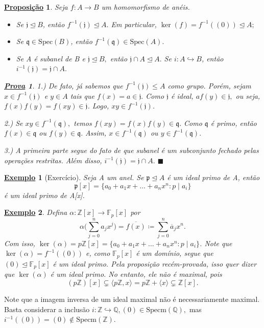 \documentclass{article}
\newtheorem*{prop*}{\underline{Proposi\c c\~ao}}
\newtheorem{example}{\underline{Exemplo}}
\newtheorem*{proof*}{\underline{Prova}}
\renewcommand\qedsymbol{$\blacksquare$}
\begin{document}
\begin{prop*}
  Seja \(f:A\rightarrow B\) um homomorfismo de anéis.
  \begin{itemize}
    \item[1)] Se \(\mathfrak{j}\trianglelefteq{B}\), então \(f^{-1}(\mathfrak{j})\trianglelefteq{A}.\) Em particular, \(\ker{(f)} = f^{-1}((0))\trianglelefteq{A};\)
    \item[2)] Se \(\mathfrak{q}\in \mathrm{Spec}(B)\), então \(f^{-1}(\mathfrak{q})\in \mathrm{Spec}(A).\)
    \item[3)] Se A é subanel de B e \(\mathfrak{j}\trianglelefteq{B},\) então \(\mathfrak{j}\cap A \trianglelefteq{A}.\) Se \(i:A\hookrightarrow B\),
      então \(i^{-1}(\mathfrak{j})=\mathfrak{j}\cap A.\)
  \end{itemize}
  \begin{proof*}
    1.) De fato, já sabemos que \(f^{-1}(\mathfrak{j})\leq A\) como grupo. Porém, sejam \(x\in f^{-1}(\mathfrak{j})\)
    e \(y\in A\) tais que \(f(x) = a\in \mathfrak{j}.\) Como \(\mathfrak{j}\) é ideal, \(af(y)\in \mathfrak{j},\)
    ou seja, \(f(x)f(y) = f(xy)\in \mathfrak{j}\). Logo, \(xy\in f^{-1}(\mathfrak{j})\).

    2.) Se \(xy\in f^{-1}(\mathfrak{q}),\) temos \(f(xy) = f(x)f(y)\in \mathfrak{q}.\) Como \(\mathfrak{q}\) é primo, 
    então \(f(x)\in \mathfrak{q}\) ou \(f(y)\in \mathfrak{q}.\) Assim, \(x\in f^{-1}(\mathfrak{q})\) ou \(y\in f^{-1}(\mathfrak{q}).\)

    3.) A primeira parte segue do fato de que subanel é um subconjunto fechado pelas operações restritas. Além disso,
    \(i^{-1}(\mathfrak{j}) = \mathfrak{j}\cap A.\) \qedsymbol
  \end{proof*}
\end{prop*}
\begin{example}[Exercício]
  Seja A um anel. Se \(\mathfrak{p}\trianglelefteq A\) é um ideal primo de A, então 
  \[
    \mathfrak{p}[x] = \{a_{0} + a_{1}x + \dotsc + a_{n}x^{n}:p\mid a_{i}\}
  \]
  é um ideal primo de A[x].
\end{example}
\begin{example}
  Defina \(\alpha :\mathbb{Z}[x]\rightarrow \mathbb{F}_{p}[x]\) por 
  \[
    \alpha \biggl(\sum\limits_{j=0}^{n}a_{j}x^{j}\biggr) = \overline{f(x)}\coloneqq \sum\limits_{j=0}^{n}\overline{a}_{j}x^{n}.
  \]
  Com isso, \(\ker{(\alpha )} = p \mathbb{Z}[x] = \{a_{0} + a_1x + \dotsc +a_{n}x^{n}: p\mid a_{i}\}\). Note que 
  \(\ker{(\alpha )} = f^{-1}((0))\) e, como \(\mathbb{F}_{p}[x]\) é um domínio, segue que \((0)\trianglelefteq \mathbb{F}_{p}[x]\) é um ideal primo.
  Pela proposição recém-provada, isso quer dizer que \(\ker{(\alpha )}\) é um ideal primo. No entanto, ele não é maximal, pois 
  \[
    (p \mathbb{Z})[x] \subsetneq \langle p \mathbb{Z}, x \rangle = p \mathbb{Z} + \langle x \rangle \subsetneq \mathbb{Z}[x].
  \]
\end{example}
Note que a imagem inversa de um ideal maximal não é necessariamente maximal.
Basta considerar a inclusão \(i:\mathbb{Z}\hookrightarrow \mathbb{Q}, (0)\in \mathrm{Specm}(\mathbb{Q}),\)
mas \(i^{-1}((0)) = (0)\not\in \mathrm{Specm}(\mathbb{Z}).\)
\end{document}
